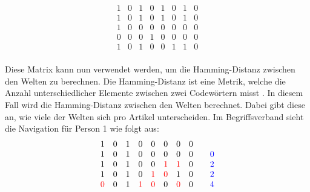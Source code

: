\setcounter{equation}{0}
\begin{equation}
    \begin{matrix}
        1 & 0 & 1 & 0 & 1 & 0 & 1 & 0 \\
        1 & 0 & 1 & 0 & 1 & 0 & 1 & 0 \\
        1 & 0 & 0 & 0 & 0 & 0 & 0 & 0 \\
        0 & 0 & 0 & 1 & 0 & 0 & 0 & 0 \\
        1 & 0 & 1 & 0 & 0 & 1 & 1 & 0 \\
    \end{matrix}
\end{equation}

Diese Matrix kann nun verwendet werden, um die Hamming-Distanz zwischen den Welten zu berechnen.
Die Hamming-Distanz ist eine Metrik, welche die Anzahl unterschiedlicher Elemente zwischen zwei Codewörtern misst \cite{hamming-code}.
In diesem Fall wird die Hamming-Distanz zwischen den Welten berechnet.
Dabei gibt diese an, wie viele der Welten sich pro Artikel unterscheiden.
Im Begriffsverband sieht die Navigation für Person 1 wie folgt aus:
\begin{equation}
    \begin{array}{ccccccccc}
        1                  & 0 & 1 & 0                  & 0                  & 0                  & 0                  & 0 &                                              \\
        1                  & 0 & 1 & 0                  & 0                  & 0                  & 0                  & 0 & \multicolumn{1}{r}{\quad\textcolor{blue}{0}} \\
        1                  & 0 & 1 & 0                  & 0                  & \textcolor{red}{1} & \textcolor{red}{1} & 0 & \multicolumn{1}{r}{\quad\textcolor{blue}{2}} \\
        1                  & 0 & 1 & 0                  & \textcolor{red}{1} & \textcolor{red}{0} & 1                  & 0 & \multicolumn{1}{r}{\quad\textcolor{blue}{2}} \\
        \textcolor{red}{0} & 0 & 1 & \textcolor{red}{1} & \textcolor{red}{0} & 0                  & \textcolor{red}{0} & 0 & \multicolumn{1}{r}{\quad\textcolor{blue}{4}} \\
    \end{array}
    \label{eq:hamming-distance}
\end{equation}

